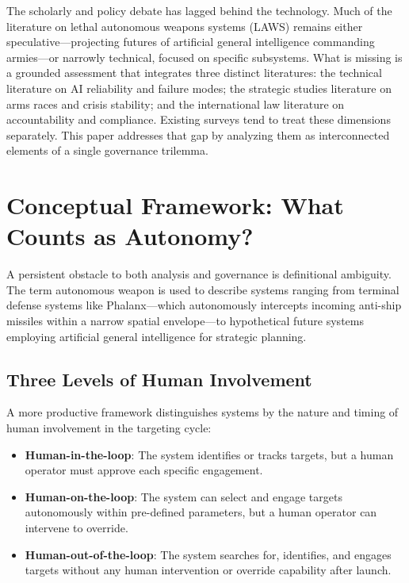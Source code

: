 \documentclass[11pt,a4paper]{article}
\begin{document}
The scholarly and policy debate has lagged behind the technology. Much of the literature on lethal autonomous weapons systems (LAWS) remains either speculative---projecting futures of artificial general intelligence commanding armies---or narrowly technical, focused on specific subsystems. What is missing is a grounded assessment that integrates three distinct literatures: the technical literature on AI reliability and failure modes; the strategic studies literature on arms races and crisis stability; and the international law literature on accountability and compliance. Existing surveys tend to treat these dimensions separately. This paper addresses that gap by analyzing them as interconnected elements of a single governance trilemma.

\section{Conceptual Framework: What Counts as Autonomy?}

A persistent obstacle to both analysis and governance is definitional ambiguity. The term autonomous weapon is used to describe systems ranging from terminal defense systems like Phalanx---which autonomously intercepts incoming anti-ship missiles within a narrow spatial envelope---to hypothetical future systems employing artificial general intelligence for strategic planning.

\subsection{Three Levels of Human Involvement}

A more productive framework distinguishes systems by the nature and timing of human involvement in the targeting cycle:

\begin{itemize}
\item \textbf{Human-in-the-loop}: The system identifies or tracks targets, but a human operator must approve each specific engagement.
\item \textbf{Human-on-the-loop}: The system can select and engage targets autonomously within pre-defined parameters, but a human operator can intervene to override.
\item \textbf{Human-out-of-the-loop}: The system searches for, identifies, and engages targets without any human intervention or override capability after launch.
\end{itemize}
\end{document}
